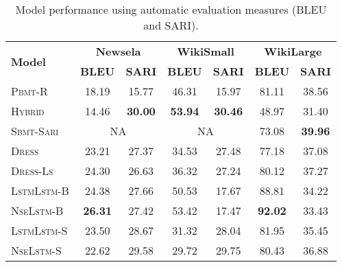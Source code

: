 \documentclass[11pt,a4paper]{article}
\begin{document}
\begin{table}[t]
\centering
\begin{adjustbox}{max width=0.48\textwidth}
\begin{tabular}{| l | c c | c c | c c |} 
 \hline
\multirow{2}{*}{\textbf{Model}}  & \multicolumn{2}{|c|}{\textbf{Newsela}} & \multicolumn{2}{|c|}{\textbf{WikiSmall}} & \multicolumn{2}{|c|}{\textbf{WikiLarge}} \\[0.2ex] 
 \cline{2-7}
& \textbf{BLEU} & \textbf{SARI}  & \textbf{BLEU} & \textbf{SARI}  & \textbf{BLEU} & \textbf{SARI}  \\
 \hline\hline
 \textsc{Pbmt-R} & 18.19 & 15.77 & 46.31 & 15.97 &81.11 & 38.56 \\
 \textsc{Hybrid} & 14.46 & \textbf{30.00} & \textbf{53.94} & \textbf{30.46} & 48.97& 31.40  \\
 \textsc{Sbmt-Sari} & \multicolumn{2}{|c|}{{NA}} & \multicolumn{2}{|c|}{{NA}} & 73.08 & \textbf{39.96} \\
 \textsc{Dress} & 23.21 & 27.37  & 34.53 & 27.48 & 77.18 & 37.08 \\
 \textsc{Dress-Ls} & 24.30& 26.63 & 36.32 & 27.24 &  80.12  & 37.27 \\
  \hline\hline
  \textsc{LstmLstm-B} & 24.38 & 27.66  & 50.53 & 17.67 & 88.81 & 34.22 \\
 \textsc{NseLstm-B} & \textbf{26.31} & 27.42  & 53.42 &17.47 & \textbf{92.02} & 33.43 \\
   \hline\hline
  \textsc{LstmLstm-S} & 23.50 &28.67 & 31.32 & 28.04 & 
 81.95 & 35.45 
\\
 \textsc{NseLstm-S} & 22.62 &29.58 & 29.72 & 29.75  & 80.43 & 36.88 
\\
 \hline
\end{tabular}\end{adjustbox}
\\[3mm]
\caption{Model performance using automatic evaluation measures (BLEU and SARI).}
\label{tbl2}
\vspace*{-4mm}
\end{table}
\end{document}
